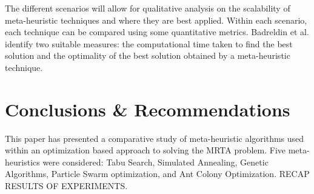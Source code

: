 \documentclass[a4paper]{article}
\begin{document}
The different scenarios will allow for qualitative analysis on the scalability of meta-heuristic techniques and where they are best applied. Within each scenario, each technique can be compared using some quantitative metrics. Badreldin et al. \cite{Badreldin} identify two suitable measures: the computational time taken to find the best solution and the optimality of the best solution obtained by a meta-heuristic technique.

\section{Conclusions \& Recommendations}


This paper has presented a comparative study of meta-heuristic algorithms used within an optimization based approach to solving the MRTA problem. Five meta-heuristics were considered: Tabu Search, Simulated Annealing, Genetic Algorithms, Particle Swarm optimization, and Ant Colony Optimization. RECAP RESULTS OF EXPERIMENTS.

\printbibliography






\end{document}
